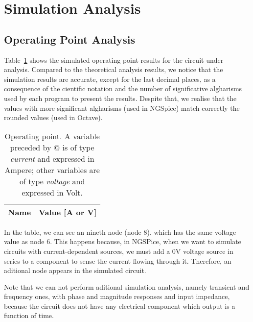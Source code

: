 \section{Simulation Analysis}
\label{sec:simulation}

\subsection{Operating Point Analysis}

	Table~\ref{tab:op} shows the simulated operating point results for the circuit
under analysis. Compared to the theoretical analysis results, we notice that the
simulation results are accurate, except for the last decimal places, 
as a consequence of the cientific notation and the number of significative algharisms 
used by each program to present the results. Despite that, we realise that the 
values with more significant algharisms (used in NGSpice) match correctly the 
rounded values (used in Octave).


\begin{table}[h]
  \centering
  \begin{tabular}{|l|r|}
    \hline    
    {\bf Name} & {\bf Value [A or V]} \\ \hline
    
  \end{tabular}
  \caption{Operating point. A variable preceded by @ is of type {\em current}
    and expressed in Ampere; other variables are of type {\it voltage} and expressed in
    Volt.}
  \label{tab:op}
\end{table}

In the table, we can see an nineth node (node 8), which has the same voltage value as node 6. This happens because, in NGSPice, when we want to simulate circuits with current-dependent sources, we must add a 0V voltage source in series to a component to sense the current flowing through it. Therefore, an aditional node appears in the simulated circuit.

Note that we can not perform aditional simulation analysis, namely transient and frequency ones, with phase and magnitude responses and input impedance, because the circuit does not have any electrical component which output is a function of time.

